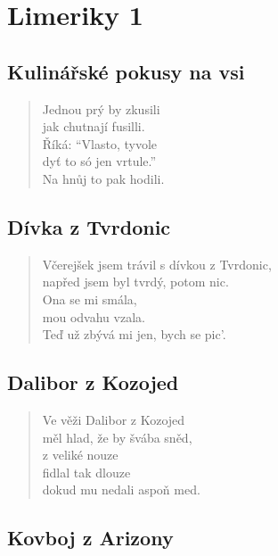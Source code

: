 \section{Limeriky 1}

\begin{multicols}{2}
	


\subsection{Kulinářské pokusy na vsi}

\begin{verse}
Jednou prý by zkusili \\
jak chutnají fusilli.\\
Říká: “Vlasto, tyvole\\
dyť to só jen vrtule.”\\
Na hnůj to pak hodili.
\end{verse}


\subsection{Dívka z Tvrdonic}

\begin{verse}
Včerejšek jsem trávil s dívkou z Tvrdonic,\\
napřed jsem byl tvrdý, potom nic.\\
Ona se mi smála,\\
mou odvahu vzala.\\
Teď už zbývá mi jen, bych se pic’.
\end{verse}

\subsection{Dalibor z Kozojed}

\begin{verse}
Ve věži Dalibor z Kozojed\\
měl hlad, že by švába sněd,\\
z veliké nouze\\
fidlal tak dlouze\\
dokud mu nedali aspoň med.
\end{verse}

\columnbreak

\subsection{Kovboj z Arizony}


\end{multicols}
